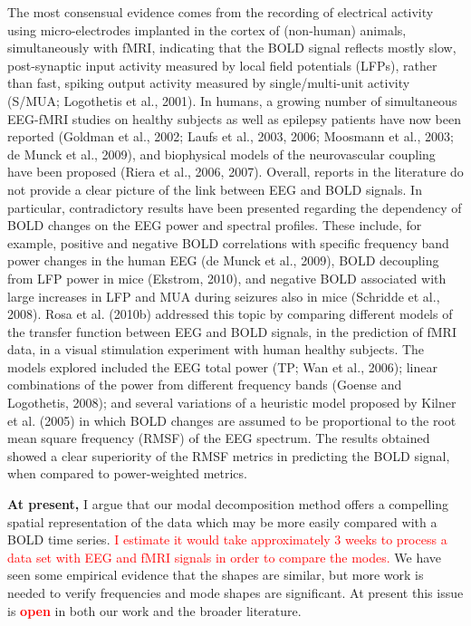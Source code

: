 \begin{displayquote}
The most consensual evidence comes from the recording of electrical activity using micro-electrodes implanted in the cortex of (non-human) animals, simultaneously with fMRI, indicating that the BOLD signal reflects mostly slow, post-synaptic input activity measured by local field potentials (LFPs), rather than fast, spiking output activity measured by single/multi-unit activity (S/MUA; Logothetis et al., 2001). In humans, a growing number of simultaneous EEG-fMRI studies on healthy subjects as well as epilepsy patients have now been reported (Goldman et al., 2002; Laufs et al., 2003, 2006; Moosmann et al., 2003; de Munck et al., 2009), and biophysical models of the neurovascular coupling have been proposed (Riera et al., 2006, 2007). Overall, reports in the literature do not provide a clear picture of the link between EEG and BOLD signals. In particular, contradictory results have been presented regarding the dependency of BOLD changes on the EEG power and spectral profiles. These include, for example, positive and negative BOLD correlations with specific frequency band power changes in the human EEG (de Munck et al., 2009), BOLD decoupling from LFP power in mice (Ekstrom, 2010), and negative BOLD associated with large increases in LFP and MUA during seizures also in mice (Schridde et al., 2008). Rosa et al. (2010b) addressed this topic by comparing different models of the transfer function between EEG and BOLD signals, in the prediction of fMRI data, in a visual stimulation experiment with human healthy subjects. The models explored included the EEG total power (TP; Wan et al., 2006); linear combinations of the power from different frequency bands (Goense and Logothetis, 2008); and several variations of a heuristic model proposed by Kilner et al. (2005) in which BOLD changes are assumed to be proportional to the root mean square frequency (RMSF) of the EEG spectrum. The results obtained showed a clear superiority of the RMSF metrics in predicting the BOLD signal, when compared to power-weighted metrics.
\end{displayquote}
\textbf{At present,} I argue that our modal decomposition method offers a compelling spatial representation of the data which may be more easily compared with a BOLD time series. \textcolor{red}{I estimate it would take approximately 3 weeks to process a data set with EEG and fMRI signals in order to compare the modes.} We have seen some empirical evidence that the shapes are similar, but more work is needed to verify frequencies and mode shapes are significant. At present this issue is \textbf{\textcolor{red}{open}} in both our work and the broader literature.

